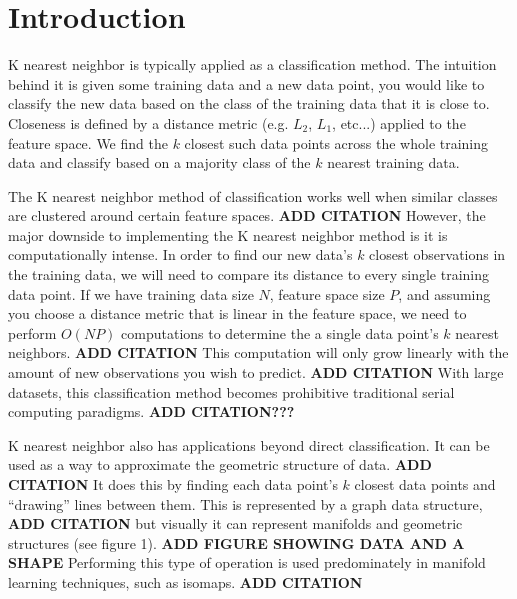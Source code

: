 \chapter{Introduction}

\vspace{5 mm}
\noindent
K nearest neighbor is typically applied as a classification method. The 
intuition behind it is given some training data and a new data point, you would 
like to classify the new data based on the class of the training data that it 
is close to. Closeness is defined by a distance metric (e.g. $L_{2}$, $L_{1}$, 
etc...) applied to the feature space. We find the $k$ closest such data points 
across the whole training data and classify based on a majority class of the 
$k$ nearest training data.

\vspace{5 mm}
\noindent
The K nearest neighbor method of classification works well when similar classes 
are clustered around certain feature spaces.
\textbf{ADD CITATION} 
However, the major downside to 
implementing the K nearest neighbor method is it is computationally intense. 
In order to find our new data's $k$ closest observations in the training data, 
we will need to compare its distance to every single training data point. 
If we have training data size $N$, feature space size $P$, and assuming you 
choose a distance metric that is linear in the feature space, we need to 
perform $O(NP)$ computations to determine the a single data point's $k$ nearest 
neighbors.
\textbf{ADD CITATION}
This computation will only grow linearly with the amount of new observations 
you wish to predict.
\textbf{ADD CITATION}
With large datasets, this classification method becomes prohibitive traditional 
serial computing paradigms.
\textbf{ADD CITATION???}

\vspace{5 mm}
\noindent
K nearest neighbor also has applications beyond direct classification. It can 
be used as a way to approximate the geometric structure of data.
\textbf{ADD CITATION}
It does this by finding each data point's $k$ closest data points and 
``drawing'' lines between them. This is represented by a graph data structure, 
\textbf{ADD CITATION} but visually it can represent manifolds and geometric 
structures (see figure 1).
\textbf{ADD FIGURE SHOWING DATA AND A SHAPE} 
Performing this type of operation is used predominately in manifold learning 
techniques, such as isomaps.
\textbf{ADD CITATION}

